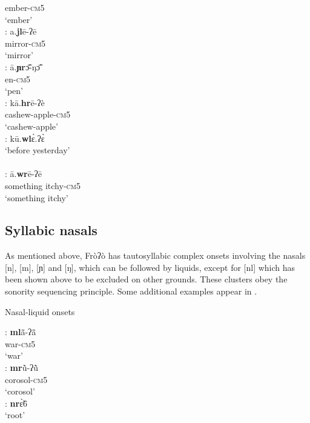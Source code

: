 \documentclass[output=paper]{langscibook}
\begin{document}
\begin{exe}
\begin{multicols}{2}
\begin{xlisti}
            {}  ember-\textsc{cm}5\\
            {} `ember' \\
        \ex \glll [jl]:      a.\textbf{jl}ē-ʔē \\
            {}   mirror-\textsc{cm}5  \\
            {} `mirror'\\
        \ex \glll [ɲr]:   ā.\textbf{ɲr}ɔ̃̄-ŋɔ̃̄ \\
            {}  en-\textsc{cm}5 \\
            {} `pen'\\
        \ex \glll  [hr]:    kā.\textbf{hr}ē-ʔè\\
            {}  cashew-apple-\textsc{cm}5\\
            {}  `cashew-apple'\\
        \ex \glll [wl]:  kū.\textbf{wl}ɛ̀.ʔɛ̀ \\
            {} {`before yesterday'}\\
            {} {}\\
        \ex \glll  [wr]:    ā.\textbf{wr}ē-ʔē\\
            {} {something itchy-\textsc{cm}5}\\
            {} {`something itchy'}\\
     \end{xlisti}
     \end{multicols}
 \end{exe}

\subsection{ Syllabic nasals}
\label{sec:traore:syllabicnasals:2d}

As mentioned above, Fròʔò has tautosyllabic complex onsets involving the nasals [n], [m], [ɲ] and [ŋ], which can be followed by liquids, except for [nl] which has been shown above to be excluded on other grounds. These clusters obey the sonority sequencing principle. Some additional examples appear in .

 \begin{exe}\setlength{\multicolsep}{0pt}
    \ex Nasal-liquid onsets \label{ex:traore:nasalWithLiquids:16}
     \begin{multicols}{3}
        \begin{xlist}
            \ex \glll [ml]:       \textbf{ml}ã̄-ʔã̄ \\
                {}  war-\textsc{cm}5 \\
                {} `war'\\
            \ex \glll [mr]:       \textbf{mr}ũ̀-ʔũ̀ \\
                {}   corosol-\textsc{cm}5\\
                {}  `corosol'\\
            \ex \gll [nr]:      \textbf{nr}ɛ̃̀6 \\
                {}  `root'\\
        \end{xlist}
     \end{multicols}
 \end{exe}
\end{document}
